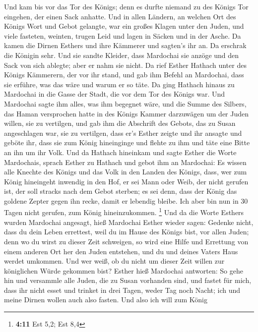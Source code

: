  Und kam bis vor das Tor des Königs; denn es durfte niemand
zu des Königs Tor eingehen, der einen Sack anhatte.  Und in
allen Ländern, an welchen Ort des Königs Wort und Gebot gelangte, war
ein großes Klagen unter den Juden, und viele fasteten, weinten, trugen
Leid und lagen in Säcken und in der Asche.  Da kamen die
Dirnen Esthers und ihre Kämmerer und sagten's ihr an. Da erschrak die
Königin sehr. Und sie sandte Kleider, dass Mardochai sie anzöge und den
Sack von sich ablegte; aber er nahm sie nicht.  Da rief
Esther Hathach unter des Königs Kämmerern, der vor ihr stand, und gab
ihm Befehl an Mardochai, dass sie erführe, was das wäre und warum er so
täte.  Da ging Hathach hinaus zu Mardochai in die Gasse der
Stadt, die vor dem Tor des Königs war.  Und Mardochai sagte
ihm alles, was ihm begegnet wäre, und die Summe des Silbers, das Haman
versprochen hatte in des Königs Kammer darzuwägen um der Juden willen,
sie zu vertilgen,  und gab ihm die Abschrift des Gebots, das
zu Susan angeschlagen war, sie zu vertilgen, dass er's Esther zeigte und
ihr ansagte und geböte ihr, dass sie zum König hineinginge und flehte zu
ihm und täte eine Bitte an ihn um ihr Volk.  Und da Hathach
hineinkam und sagte Esther die Worte Mardochais,  sprach
Esther zu Hathach und gebot ihm an Mardochai:  Es wissen
alle Knechte des Königs und das Volk in den Landen des Königs, dass, wer
zum König hineingeht inwendig in den Hof, er sei Mann oder Weib, der
nicht gerufen ist, der soll stracks nach dem Gebot sterben; es sei denn,
dass der König das goldene Zepter gegen ihn recke, damit er lebendig
bleibe. Ich aber bin nun in 30 Tagen nicht gerufen, zum König
hineinzukommen. \footnote{\textbf{4:11} Est 5,2; Est 8,4} 
Und da die Worte Esthers wurden Mardochai angesagt,  hieß
Mardochai Esther wieder sagen: Gedenke nicht, dass du dein Leben
errettest, weil du im Hause des Königs bist, vor allen Juden;
 denn wo du wirst zu dieser Zeit schweigen, so wird eine
Hilfe und Errettung von einem anderen Ort her den Juden entstehen, und
du und deines Vaters Haus werdet umkommen. Und wer weiß, ob du nicht um
dieser Zeit willen zur königlichen Würde gekommen bist? 
Esther hieß Mardochai antworten:  So gehe hin und versammle
alle Juden, die zu Susan vorhanden sind, und fastet für mich, dass ihr
nicht esset und trinket in drei Tagen, weder Tag noch Nacht; ich und
meine Dirnen wollen auch also fasten. Und also ich will zum König
